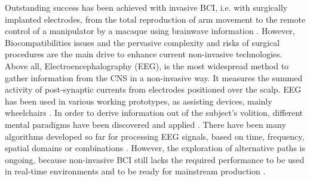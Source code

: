 \documentclass[nouppercase]{ifmbe}
\begin{document}






Outstanding success has been achieved with invasive BCI, i.e. with surgically implanted electrodes, from the total reproduction of arm movement \cite{c27} to the remote control of a manipulator by a macaque using brainwave information \cite{c29}. However, Biocompatibilities issues and the pervasive complexity and risks of surgical procedures are the main drive to enhance current non-invasive technologies.  Above all, Electroencephalography (EEG), is the most widespread method to gather information from the CNS in a non-invasive way. It measures the summed activity of post-synaptic currents from electrodes positioned over the scalp. EEG has been used in various working prototypes, as assisting devices, mainly wheelchairs \cite{c98,c97}.  In order to derive information out of the subject's volition, different mental paradigms have been discovered and applied \cite{c37}.  There have been many algorithms developed so far for processing EEG signals, based on time, frequency, spatial domains or combinations \cite{c37,c12}. However, the exploration of alternative paths is ongoing, because non-invasive BCI still lacks the required performance to be used in real-time environments and to be ready for mainstream production \cite{c55,c56}.


\end{document}
